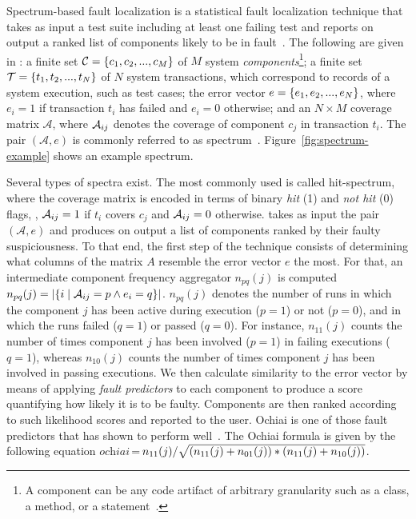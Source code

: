 \documentclass{article}
\begin{document}
Spectrum-based fault localization is a statistical fault
localization technique that takes as input a test suite including at
least one failing test and reports on output a ranked list of
components likely to be in
fault~\cite{FLSurvey2016,DBLP:conf/kbse/JonesH05,DBLP:journals/smr/LuciaLJTB14,DBLP:journals/jss/AbreuZGG09}. The
following are given in \sfl{}: a finite set $\mathcal{C}=\{{}c_1,c_2,...,c_M\}$ of $M$ system \emph{components}\footnote{A
  component can be any code artifact of arbitrary granularity
  such as a class, a method, or a statement~\cite{DBLP:journals/stvr/HarroldRSWY00}.}; a finite set
$\mathcal{T} = \{{}t_1,t_2,...,t_N\}$ of $N$ system transactions,
which correspond to records of a system execution, such as test cases;
the error vector $e = \{{}e_1,e_2,...,e_N\}$, where $e_i = 1$ if
transaction $t_i$ has failed and $e_i = 0$ otherwise; and an
$N\times{}M$ coverage matrix $\mathcal{A}$, where $\mathcal{A}_{ij}$ denotes the
coverage of component $c_j$ in transaction $t_i$.  The pair
$(\mathcal{A},e)$ is commonly referred to as
spectrum~\cite{DBLP:journals/stvr/HarroldRSWY00}. Figure~\ref{fig:spectrum-example}
shows an example spectrum.


Several types of spectra exist.  The most commonly used is called
hit-spectrum, where the coverage matrix is encoded in terms of binary
\emph{hit} (1) and \emph{not hit} (0) flags, \ie{}, $\mathcal{A}_{ij} = 1$ if
$t_i$ covers $c_j$ and $\mathcal{A}_{ij} = 0$ otherwise.  \sfl{} takes as input
the pair $(\mathcal{A},e)$ and produces on output a list of components
ranked by their faulty suspiciousness. To that end, the first step of
the technique consists of determining what columns of the matrix $A$
resemble the error vector $e$ the most.  For that, an intermediate
component frequency aggregator $n_{pq}(j)$ is computed $n_{pq}(j) =
|\{i\mid \mathcal{A}_{ij}=p \wedge e_i=q\}|$. $n_{pq}(j)$ denotes the number of
runs in which the component $j$ has been active during execution ($p =
1$) or not ($p=0$), and in which the runs failed ($q = 1$) or passed
($q = 0$).  For instance, $n_{11}(j)$ counts the number of times
component $j$ has been involved ($p = 1$) in failing executions ($q =
1$), whereas $n_{10}(j)$ counts the number of times component $j$ has
been involved in passing executions. We then calculate similarity to
the error vector by means of applying \emph{fault predictors} to each
component to produce a score quantifying how likely it is to be
faulty.  Components are then ranked according to such likelihood
scores and reported to the user. Ochiai is one of those fault
predictors that has shown to perform
well~\cite{7390282,Pearson:2017:EIF:3097368.3097441}. The Ochiai
formula is given by the following equation
$\textit{ochiai}\,$=$\,n_{11}(j)/\sqrt{(n_{11}(j)+n_{01}(j)) * (n_{11}(j)+n_{10}(j))}$.
\end{document}
